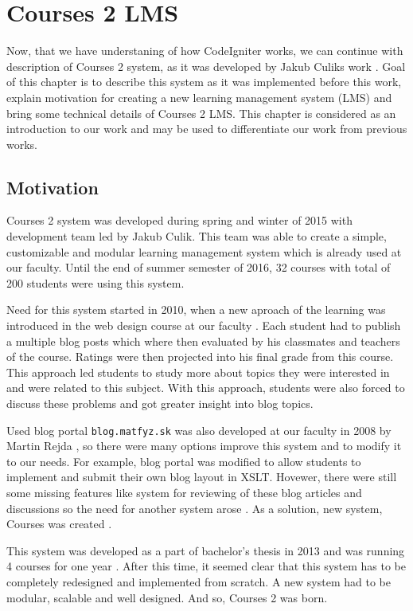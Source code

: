 \chapter{Courses 2 LMS}
\label{sec:courses}


Now, that we have understaning of how CodeIgniter works, we can continue with description of Courses 2 system, as it was developed by Jakub Culiks work \cite{culik}. Goal of this chapter is to describe this system as it was implemented before this work, explain motivation for creating a new learning management system (LMS) and bring some technical details of Courses 2 LMS. This chapter is considered as an introduction to our work and may be used to differentiate our work from previous works.

\section{Motivation}

Courses 2 system was developed during spring and winter of 2015 with development team led by Jakub Culik. This team was able to create a simple, customizable and modular learning management system which is already used at our faculty. Until the end of summer semester of 2016, 32 courses with total of 200 students were using this system.


Need for this system started in 2010, when a new aproach of the learning was introduced in the web design course at our faculty \cite{culik}. Each student had to publish a multiple blog posts which where then evaluated by his classmates and teachers of the course. Ratings were then projected into his final grade from this course. This approach led students to study more about topics they were interested in and were related to this subject. With this approach, students were also forced to discuss these problems and got greater insight into blog topics.


Used blog portal \texttt{blog.matfyz.sk} was also developed at our faculty in 2008 by Martin Rejda \cite{rejda}, so there were many options improve this system and to modify it to our needs. For example, blog portal was modified to allow students to implement and submit their own blog layout in XSLT. Hovewer, there were still some missing features like system for reviewing of these blog articles and discussions so the need for another system arose \cite{culik}. As a solution, new system, Courses was created \cite{culikbc}.


This system was developed as a part of bachelor's thesis in 2013 \cite{culikbc} and was running 4 courses for one year \cite{culik}. After this time, it seemed clear that this system has to be completely redesigned and implemented from scratch. A new system had to be modular, scalable and well designed. And so, Courses 2 was born.

